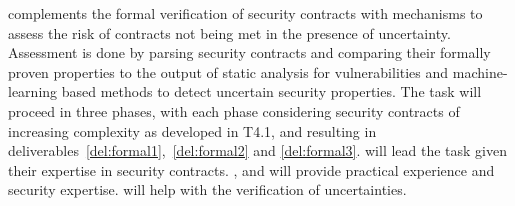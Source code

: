 \begin{Workpackage}{\thewpno}
\begin{Task}
\theTask{} complements the formal verification of security contracts with mechanisms to assess the risk of contracts not being met in the presence of uncertainty. 
Assessment is done by parsing security contracts and comparing their formally proven properties to the output of static analysis for vulnerabilities and machine-learning based methods to detect uncertain security properties. The task will proceed in three phases, with each phase considering security contracts of increasing complexity as developed in T4.1, and resulting in deliverables~\ref{del:formal1},~\ref{del:formal2} and \ref{del:formal3}. \UCM will lead the task given their expertise in security contracts.  \IBMshort, \YAGshort and \SOPRAshort will provide practical experience and security expertise. \SA will help with the verification of uncertainties.
\end{Task}


\begin{Task}

\TaskResults{%
\ref{del:formal1},
\ref{del:formal2},
\ref{del:formal3}
}
\TaskHeader{}



\end{Task}
\end{Workpackage}
